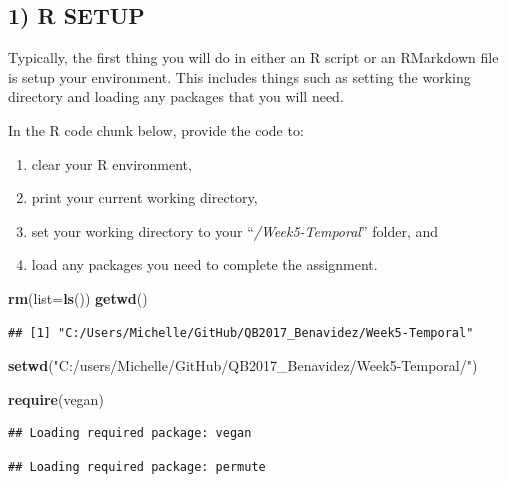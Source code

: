 \documentclass[]{article}
\newenvironment{Shaded}{\begin{snugshade}}{\end{snugshade}}
\newcommand{\KeywordTok}[1]{\textcolor[rgb]{0.13,0.29,0.53}{\textbf{{#1}}}}
\newcommand{\DataTypeTok}[1]{\textcolor[rgb]{0.13,0.29,0.53}{{#1}}}
\newcommand{\StringTok}[1]{\textcolor[rgb]{0.31,0.60,0.02}{{#1}}}
\newcommand{\NormalTok}[1]{{#1}}
\providecommand{\tightlist}{%
  \setlength{\itemsep}{0pt}\setlength{\parskip}{0pt}}
\begin{document}
\subsection{1) R SETUP}\label{r-setup}

Typically, the first thing you will do in either an R script or an
RMarkdown file is setup your environment. This includes things such as
setting the working directory and loading any packages that you will
need.

In the R code chunk below, provide the code to:

\begin{enumerate}
\def\labelenumi{\arabic{enumi}.}
\tightlist
\item
  clear your R environment,
\item
  print your current working directory,
\item
  set your working directory to your ``\emph{/Week5-Temporal}'' folder,
  and
\item
  load any packages you need to complete the assignment.
\end{enumerate}

\begin{Shaded}
\begin{Highlighting}[]
\KeywordTok{rm}\NormalTok{(}\DataTypeTok{list=}\KeywordTok{ls}\NormalTok{())}
\KeywordTok{getwd}\NormalTok{() }
\end{Highlighting}
\end{Shaded}

\begin{verbatim}
## [1] "C:/Users/Michelle/GitHub/QB2017_Benavidez/Week5-Temporal"
\end{verbatim}

\begin{Shaded}
\begin{Highlighting}[]
\KeywordTok{setwd}\NormalTok{(}\StringTok{"C:/users/Michelle/GitHub/QB2017_Benavidez/Week5-Temporal/"}\NormalTok{)}

\KeywordTok{require}\NormalTok{(vegan)}
\end{Highlighting}
\end{Shaded}

\begin{verbatim}
## Loading required package: vegan
\end{verbatim}

\begin{verbatim}
## Loading required package: permute
\end{verbatim}
\end{document}
